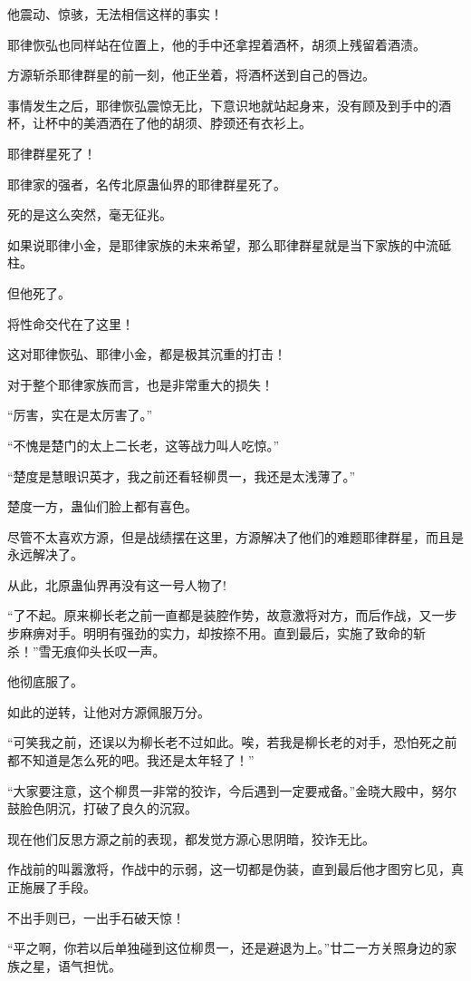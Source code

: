 \begin{this_body}
他震动、惊骇，无法相信这样的事实！

耶律恢弘也同样站在位置上，他的手中还拿捏着酒杯，胡须上残留着酒渍。

方源斩杀耶律群星的前一刻，他正坐着，将酒杯送到自己的唇边。

事情发生之后，耶律恢弘震惊无比，下意识地就站起身来，没有顾及到手中的酒杯，让杯中的美酒洒在了他的胡须、脖颈还有衣衫上。

耶律群星死了！

耶律家的强者，名传北原蛊仙界的耶律群星死了。

死的是这么突然，毫无征兆。

如果说耶律小金，是耶律家族的未来希望，那么耶律群星就是当下家族的中流砥柱。

但他死了。

将性命交代在了这里！

这对耶律恢弘、耶律小金，都是极其沉重的打击！

对于整个耶律家族而言，也是非常重大的损失！

“厉害，实在是太厉害了。”

“不愧是楚门的太上二长老，这等战力叫人吃惊。”

“楚度是慧眼识英才，我之前还看轻柳贯一，我还是太浅薄了。”

楚度一方，蛊仙们脸上都有喜色。

尽管不太喜欢方源，但是战绩摆在这里，方源解决了他们的难题耶律群星，而且是永远解决了。

从此，北原蛊仙界再没有这一号人物了!

“了不起。原来柳长老之前一直都是装腔作势，故意激将对方，而后作战，又一步步麻痹对手。明明有强劲的实力，却按捺不用。直到最后，实施了致命的斩杀！”雪无痕仰头长叹一声。

他彻底服了。

如此的逆转，让他对方源佩服万分。

“可笑我之前，还误以为柳长老不过如此。唉，若我是柳长老的对手，恐怕死之前都不知道是怎么死的吧。我还是太年轻了！”

“大家要注意，这个柳贯一非常的狡诈，今后遇到一定要戒备。”金晓大殿中，努尔鼓脸色阴沉，打破了良久的沉寂。

现在他们反思方源之前的表现，都发觉方源心思阴暗，狡诈无比。

作战前的叫嚣激将，作战中的示弱，这一切都是伪装，直到最后他才图穷匕见，真正施展了手段。

不出手则已，一出手石破天惊！

“平之啊，你若以后单独碰到这位柳贯一，还是避退为上。”廿二一方关照身边的家族之星，语气担忧。


\end{this_body}
